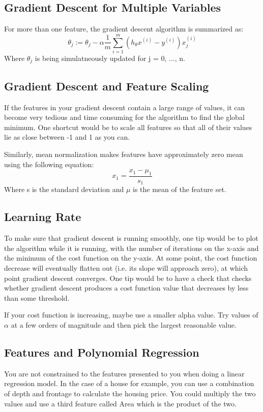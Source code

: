 \subsection{Gradient Descent for Multiple Variables}
For more than one feature, the gradient descent algorithm is summarized as:
\begin{equation}
	\theta_j := \theta_j - \alpha\frac{1}{m}\sum_{i=1}^{m}(h_{\theta}x^{(i)} - y^{(i)})x_j^{(i)}
\end{equation}
Where $\theta_j$ is being simulatneously updated for j = 0, ..., n. 

\subsection{Gradient Descent and Feature Scaling}
If the features in your gradient descent contain  a large range of values, it can become very tedious and time consuming for the algorithm to find the global minimum. One shortcut would be to scale all features so that all of their values lie as close between -1 and 1 as you can. 

Similarly, mean normalization makes features have approximately zero mean using the following equation:
\begin{equation}
	x_1 = \frac{x_1 - \mu_1}{s_1}
\end{equation}
Where s is the standard deviation and $\mu$ is the mean of the feature set.

\subsection{Learning Rate}
To make sure that gradient descent is running smoothly, one tip would be to plot the algorithm while it is running, with the number of iterations on the x-axis and the minimum of the cost function on the y-axis. At some point, the cost function decrease will eventually flatten out (i.e. its slope will approach zero), at which point gradient descent converges. One tip would be to have a check that checks whether gradient descent produces a cost function value that decreases by less than some threshold. 

If your cost function is increasing, maybe use a smaller alpha value. Try values of $\alpha$ at a few orders of magnitude and then pick the largest reasonable value. 

\subsection{Features and Polynomial Regression}
You are not constrained to the features presented to you when doing a linear regression model. In the case of a house for example, you can use a combination of depth and frontage to calculate the housing price. You could multiply the two values and use a third feature called Area which is the product of the two. 

